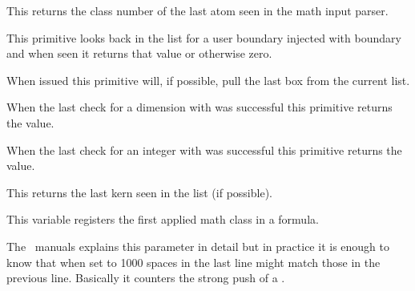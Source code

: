 This returns the class number of the last atom seen in the math input parser.

\stopnewprimitive

\startnewprimitive[title={\prm {lastboundary}}]

This primitive looks back in the list for a user boundary injected with \prm
{boundary} and when seen it returns that value or otherwise zero.

\stopnewprimitive

\startoldprimitive[title={\prm {lastbox}}]

When issued this primitive will, if possible, pull the last box from the current
list.

\stopoldprimitive

\startnewprimitive[title={\prm {lastchkdimension}}]

When the last check for a dimension with  was successful
this primitive returns the value.

\stopnewprimitive

\startnewprimitive[title={\prm {lastchknumber}}]

When the last check for an integer with  was successful this
primitive returns the value.

\stopnewprimitive

\startoldprimitive[title={\prm {lastkern}}]

This returns the last kern seen in the list (if possible).

\stopoldprimitive

\startnewprimitive[title={\prm {lastleftclass}}]

This variable registers the first applied math class in a formula.

\stopnewprimitive


\startoldprimitive[title={\prm {lastlinefit}}]

The \ETEX\ manuals explains this parameter in detail but in practice it is enough
to know that when set to 1000 spaces in the last line might match those in the
previous line. Basically it counters the strong push of a .

\stopoldprimitive


